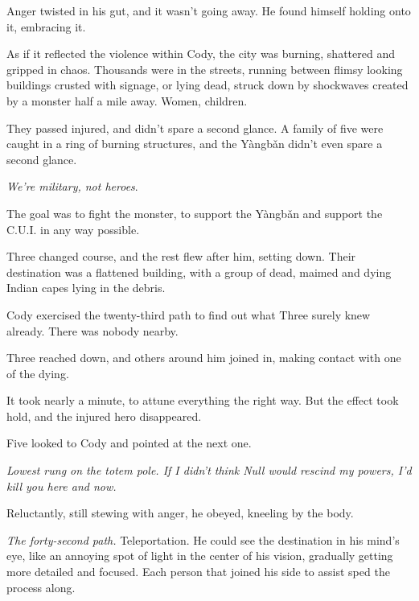 Anger twisted in his gut, and it wasn't going away.  He found himself holding onto it, embracing it.



As if it reflected the violence within Cody, the city was burning, shattered and gripped in chaos.  Thousands were in the streets, running between flimsy looking buildings crusted with signage, or lying dead, struck down by shockwaves created by a monster half a mile away.  Women, children.



They passed injured, and didn't spare a second glance.  A family of five were caught in a ring of burning structures, and the Y\`{a}ngb\v{a}n didn't even spare a second glance.



\emph{We're military, not heroes}.



The goal was to fight the monster, to support the Y\`{a}ngb\v{a}n and support the C.U.I. in any way possible.



Three changed course, and the rest flew after him, setting down.  Their destination was a flattened building, with a group of dead, maimed and dying Indian capes lying in the debris.



Cody exercised the twenty-third path to find out what Three surely knew already.  There was nobody nearby.



Three reached down, and others around him joined in, making contact with one of the dying.



It took nearly a minute, to attune everything the right way.  But the effect took hold, and the injured hero disappeared.



Five looked to Cody and pointed at the next one.



\emph{Lowest rung on the totem pole.  If I didn't think Null would rescind my powers, I'd kill you here and now.}



Reluctantly, still stewing with anger, he obeyed, kneeling by the body.



\emph{The forty-second path.  }Teleportation. \emph{ }He could see the destination in his mind's eye, like an annoying spot of light in the center of his vision, gradually getting more detailed and focused.  Each person that joined his side to assist sped the process along.




